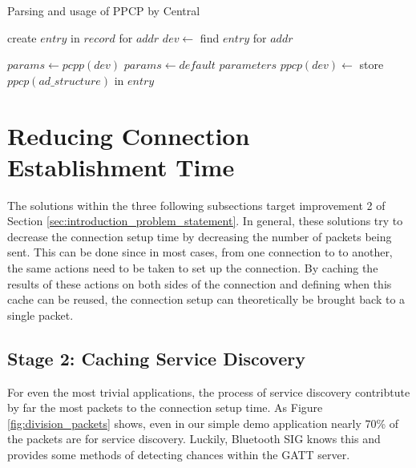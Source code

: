 \begin{algorithm}
    \caption{Parsing and usage of PPCP by Central}
    \label{alg:on_device_found}
    \begin{algorithmic}[1] 
                \State create $entry$ in $record$ for $addr$
            \EndIf
            \State $dev \gets $ find $entry$ for $addr$
            \State {}

                    \State $params \gets \textit{pcpp}(dev)$
                \Else
                    \State $params \gets default$ $parameters$
                \EndIf
                \State {}
            \EndIf
        \EndProcedure
                        \State $\textit{ppcp}(dev) \gets $ store $\textit{ppcp}(ad\_structure)$ in $entry$
                    \EndIf
                \EndIf
            \EndFor
        \EndProcedure
    \end{algorithmic}
\end{algorithm}

\section{Reducing Connection Establishment Time}
The solutions within the three following subsections target improvement 2 of Section \ref{sec:introduction_problem_statement}. In general, these solutions try to decrease the connection setup time by decreasing the number of packets being sent. This can be done since in most cases, from one connection to to another, the same actions need to be taken to set up the connection. By caching the results of these actions on both sides of the connection and defining when this cache can be reused, the connection setup can theoretically be brought back to a single packet.

\subsection{Stage 2: Caching Service Discovery}
For even the most trivial applications, the process of service discovery contribtute by far the most packets to the connection setup time. As Figure \ref{fig:division_packets} shows, even in our simple demo application nearly 70\% of the packets are for service discovery. Luckily, Bluetooth SIG knows this and provides some methods of detecting chances within the GATT server.


